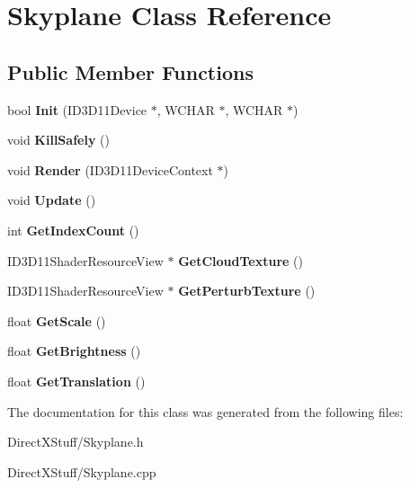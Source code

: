 \hypertarget{class_skyplane}{\section{Skyplane Class Reference}
\label{class_skyplane}
}
\subsection*{Public Member Functions}
\begin{DoxyCompactItemize}
\item 
\hypertarget{class_skyplane_a893d4d60bfd72dfd6ffeedc823aad6ae}{bool {\bfseries Init} (I\-D3\-D11\-Device $\ast$, W\-C\-H\-A\-R $\ast$, W\-C\-H\-A\-R $\ast$)}\label{class_skyplane_a893d4d60bfd72dfd6ffeedc823aad6ae}

\item 
\hypertarget{class_skyplane_ad1f06e501c5de7d5fbd4079ba92bbf4d}{void {\bfseries Kill\-Safely} ()}\label{class_skyplane_ad1f06e501c5de7d5fbd4079ba92bbf4d}

\item 
\hypertarget{class_skyplane_a1aa561160fec8a8c1a71b01411e180f9}{void {\bfseries Render} (I\-D3\-D11\-Device\-Context $\ast$)}\label{class_skyplane_a1aa561160fec8a8c1a71b01411e180f9}

\item 
\hypertarget{class_skyplane_a8c00dbf9def3b25cfae61e7d25e3320c}{void {\bfseries Update} ()}\label{class_skyplane_a8c00dbf9def3b25cfae61e7d25e3320c}

\item 
\hypertarget{class_skyplane_a80c5102fbe8f45778fcd71005465be07}{int {\bfseries Get\-Index\-Count} ()}\label{class_skyplane_a80c5102fbe8f45778fcd71005465be07}

\item 
\hypertarget{class_skyplane_ac9469e7c6ae71837209bbd86b5549106}{I\-D3\-D11\-Shader\-Resource\-View $\ast$ {\bfseries Get\-Cloud\-Texture} ()}\label{class_skyplane_ac9469e7c6ae71837209bbd86b5549106}

\item 
\hypertarget{class_skyplane_accac54f0b0800c81357a467e463e35cd}{I\-D3\-D11\-Shader\-Resource\-View $\ast$ {\bfseries Get\-Perturb\-Texture} ()}\label{class_skyplane_accac54f0b0800c81357a467e463e35cd}

\item 
\hypertarget{class_skyplane_a3d75f7dd19dc5c4417774d55ff2aecf5}{float {\bfseries Get\-Scale} ()}\label{class_skyplane_a3d75f7dd19dc5c4417774d55ff2aecf5}

\item 
\hypertarget{class_skyplane_ab45cbb865980144e334fe6ad1e64887d}{float {\bfseries Get\-Brightness} ()}\label{class_skyplane_ab45cbb865980144e334fe6ad1e64887d}

\item 
\hypertarget{class_skyplane_a341c1339e14647e25586331448cdd453}{float {\bfseries Get\-Translation} ()}\label{class_skyplane_a341c1339e14647e25586331448cdd453}

\end{DoxyCompactItemize}


The documentation for this class was generated from the following files\-:\begin{DoxyCompactItemize}
\item 
Direct\-X\-Stuff/Skyplane.\-h\item 
Direct\-X\-Stuff/Skyplane.\-cpp\end{DoxyCompactItemize}
